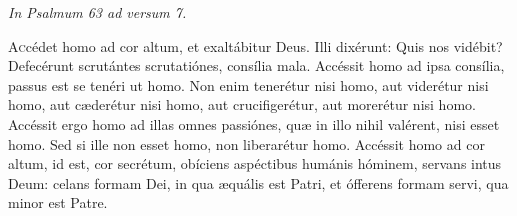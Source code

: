 
{\hfill \textit{In Psalmum 63 ad versum 7.}}

\lettrine{A}{c}cédet homo ad cor altum, et exaltábitur Deus. Illi dixérunt: Quis nos vidébit? Defecérunt scrutántes scrutatiónes, consília mala. Accéssit homo ad ipsa consília, passus est se tenéri ut homo. Non enim tenerétur nisi homo, aut viderétur nisi homo, aut cæderétur nisi homo, aut crucifigerétur, aut morerétur nisi homo. Accéssit ergo homo ad illas omnes passiónes, quæ in illo nihil valérent, nisi esset homo. Sed si ille non esset homo, non liberarétur homo. Accéssit homo ad cor altum, id est, cor secrétum, obíciens aspéctibus humánis hóminem, servans intus Deum: celans formam Dei, in qua æquális est Patri, et ófferens formam servi, qua minor est Patre.
